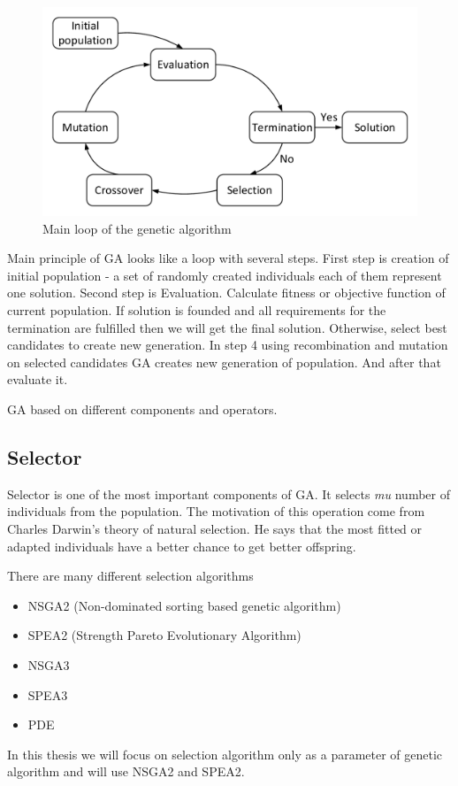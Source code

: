 \begin{figure}
	\centering
	\includegraphics{images/GeneticLoop}
	\caption{Main loop of the genetic algorithm}\label{fig:GeneticLoop}
\end{figure}
Main principle of GA looks like a loop with several steps.
First step is creation of initial population - a set of randomly created individuals each of them represent one solution. 
Second step is Evaluation. Calculate fitness or objective function of current population.
If solution is founded and all requirements for the termination are fulfilled then we will get the final solution. Otherwise, select best candidates to create new generation.
In step 4 using recombination and mutation on selected candidates GA creates new generation of population. And after that evaluate it.

GA based on different components and operators.
\subsection{Selector}
Selector is one of the most important components of GA. It selects \textit{mu} number of individuals from the population. The motivation of this operation come from Charles Darwin's theory of natural selection. He says that the most fitted or adapted individuals have a better chance to get better offspring.

There are many different selection algorithms
\begin{itemize}
	\item NSGA2 (Non-dominated sorting based genetic algorithm)
	\item SPEA2 (Strength Pareto Evolutionary Algorithm)
	\item NSGA3
	\item SPEA3
	\item PDE 
\end{itemize}
In this thesis we will focus on selection algorithm only as a parameter of genetic algorithm and will use NSGA2 and SPEA2. 
